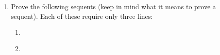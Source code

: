 \begin{enumerate}
\begin{argumentN}[1]



 {1}








\end{argumentN}


\item Prove the following sequents (keep in mind what it means to prove a 
 sequent). Each of these require only three lines:

 \begin{enumerate}
  \cover{\setlength{\itemsep}{2em}}
  \item {}
\opts{
   \dotline

   \dotline

   \dotline

   \dotline
  }
  {

\begin{argumentN}[1]




\end{argumentN}

  }


  \item {}
\opts{
   \dotline

   \dotline

   \dotline

   \dotline
  }
  {
\begin{argumentN}[1]


\end{argumentN}}
\end{enumerate}
\end{enumerate}
